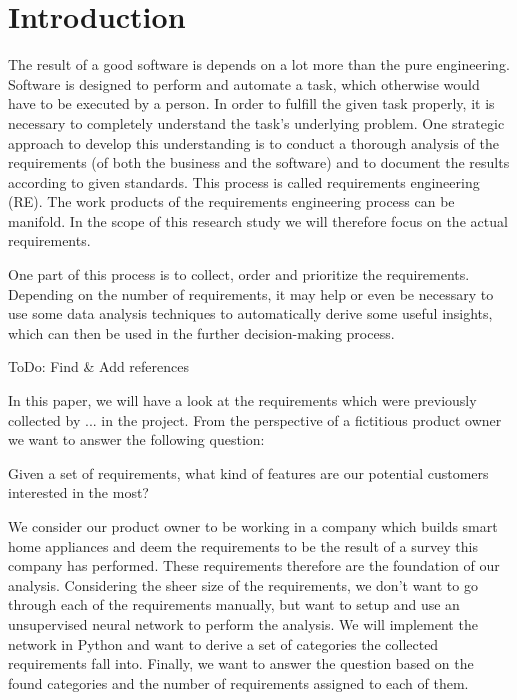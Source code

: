 \section{Introduction} %
\label{sec:introduction}
The result of a good software is depends on a lot more than the pure engineering.
Software is designed to perform and automate a task, which otherwise would have to be executed by a person.
In order to fulfill the given task properly, it is necessary to completely understand the task's underlying problem.
One strategic approach to develop this understanding is to conduct a thorough analysis of the requirements (of both the business and the software) and to document the results according to given standards. This process is called requirements engineering (RE). The work products of the requirements engineering process can be manifold. In the scope of this research study we will therefore focus on the actual requirements.

One part of this process is to collect, order and prioritize the requirements. Depending on the number of requirements, it may help or even be necessary to use some data analysis techniques to automatically derive some useful insights, which can then be used in the further decision-making process.

\colorbox{yellow!30}{ToDo:} Find \& Add references

In this paper, we will have a look at the requirements which were previously collected by ... in the \crowdre{} project. From the perspective of a fictitious product owner we want to answer the following question:

Given a set of requirements, what kind of features are our potential customers interested in the most?

We consider our product owner to be working in a company which builds smart home appliances and deem the \crowdre{} requirements to be the result of a survey this company has performed. These requirements therefore are the foundation of our analysis. Considering the sheer size of the requirements, we don't want to go through each of the requirements manually, but want to setup and use an unsupervised neural network to perform the analysis. We will implement the network in Python and want to derive a set of categories the collected requirements fall into. Finally, we want to answer the question based on the found categories and the number of requirements assigned to each of them.
